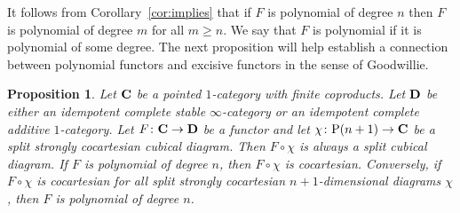 \documentclass[psamsfonts]{amsart}
\theoremstyle{plain}
\newtheorem{prop}[thm]{Proposition}
\theoremstyle{definition}
\theoremstyle{remark}
\newcommand{\catname}[1]{{\normalfont\textbf{#1}}}
\newcommand{\power}{\mathrm{P}}
\begin{document}
It follows from Corollary~\ref{cor:implies} that if $F$ is polynomial of degree $n$ then $F$ is polynomial of degree $m$ for all $m\ge n$. We say that $F$ is polynomial if it is polynomial of some degree. The next proposition will help establish a connection between polynomial functors and excisive functors in the sense of Goodwillie.
\begin{prop}\label{prop:polynomials}
Let $\catname{C}$ be a pointed $1$-category with finite coproducts. Let $\catname{D}$ be either an idempotent complete stable $\infty$-category or an idempotent complete additive $1$-category. Let $F\colon \catname{C}\to \catname{D}$ be a functor and let $\chi\colon \power(n+1)\to \catname{C}$ be a split strongly cocartesian cubical diagram. Then $F\circ \chi$ is always a split cubical diagram. If $F$ is polynomial of degree $n$, then $F\circ \chi$ is cocartesian. Conversely, if $F\circ \chi$ is cocartesian for all split strongly cocartesian $n+1$-dimensional diagrams $\chi$, then $F$ is polynomial of degree $n$.
\end{prop}
\end{document}
